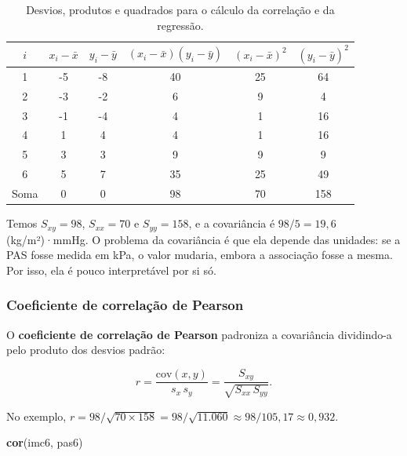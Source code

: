 \documentclass[
]{book}
\newenvironment{Shaded}{\begin{snugshade}}{\end{snugshade}}
\newcommand{\FunctionTok}[1]{\textcolor[rgb]{0.13,0.29,0.53}{\textbf{#1}}}
\newcommand{\NormalTok}[1]{#1}
\begin{document}
\begin{table}

\caption{\label{tab:an-somas}Desvios, produtos e quadrados para o cálculo da correlação e da regressão.}
\centering
\begin{tabular}[t]{c|c|c|c|c|c}
\hline
$i$ & $x_i - \bar{x}$ & $y_i - \bar{y}$ & $(x_i - \bar{x})(y_i - \bar{y})$ & $(x_i - \bar{x})^2$ & $(y_i - \bar{y})^2$\\
\hline
1 & -5 & -8 & 40 & 25 & 64\\
\hline
2 & -3 & -2 & 6 & 9 & 4\\
\hline
3 & -1 & -4 & 4 & 1 & 16\\
\hline
4 & 1 & 4 & 4 & 1 & 16\\
\hline
5 & 3 & 3 & 9 & 9 & 9\\
\hline
6 & 5 & 7 & 35 & 25 & 49\\
\hline
Soma & 0 & 0 & 98 & 70 & 158\\
\hline
\end{tabular}
\end{table}

Temos \(S_{xy} = 98\), \(S_{xx} = 70\) e \(S_{yy} = 158\), e a covariância é \(98/5 = 19{,}6\) (kg/m²)·mmHg. O problema da covariância é que ela depende das unidades: se a PAS fosse medida em kPa, o valor mudaria, embora a associação fosse a mesma. Por isso, ela é pouco interpretável por si só.

\subsubsection{Coeficiente de correlação de Pearson}\label{coeficiente-de-correlauxe7uxe3o-de-pearson}

O \textbf{coeficiente de correlação de Pearson} padroniza a covariância dividindo-a pelo produto dos desvios padrão:

\begin{equation}
r = \frac{\text{cov}(x, y)}{s_x\,s_y} = \frac{S_{xy}}{\sqrt{S_{xx}\,S_{yy}}}.
\label{eq:pearson}
\end{equation}

No exemplo, \(r = 98/\sqrt{70 \times 158} = 98/\sqrt{11.060} \approx 98/105{,}17 \approx 0{,}932\).

\begin{Shaded}
\begin{Highlighting}[]
\FunctionTok{cor}\NormalTok{(imc6, pas6)}
\end{Highlighting}
\end{Shaded}
\end{document}
